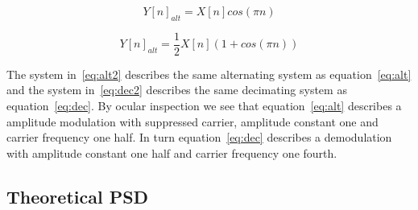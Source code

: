 \documentclass[10pt]{article}
\begin{document}
\begin{equation}
  \label{eq:alt2}
  Y[n]_{alt} =X[n]cos(\pi n)
\end{equation}

\begin{equation}
  \label{eq:dec2}
  Y[n]_{alt} =\frac{1}{2}X[n](1+cos(\pi n))
\end{equation}

The system in~\ref{eq:alt2} describes the same alternating system as equation~\ref{eq:alt} and
the system in~\ref{eq:dec2} describes the same decimating system as equation~\ref{eq:dec}.
By ocular inspection we see that equation~\ref{eq:alt} describes a amplitude modulation with 
suppressed carrier, amplitude constant one and carrier frequency one half. In turn equation~\ref{eq:dec}
describes a demodulation with amplitude constant one half and carrier frequency one fourth.

\subsection{Theoretical PSD}
\end{document}

